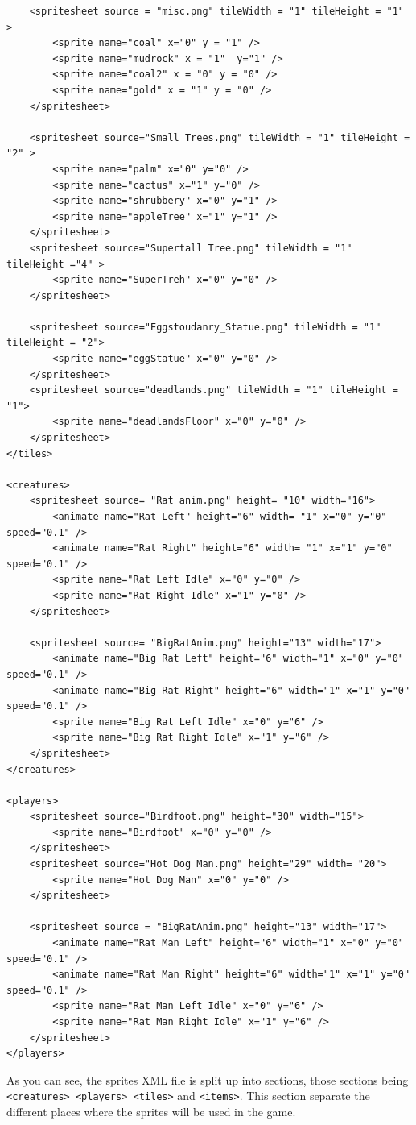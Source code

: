 \documentclass{book}
\begin{document}
\begin{verbatim}
	<spritesheet source = "misc.png" tileWidth = "1" tileHeight = "1" >
		<sprite name="coal" x="0" y = "1" />
		<sprite name="mudrock" x = "1"  y="1" />
		<sprite name="coal2" x = "0" y = "0" />
		<sprite name="gold" x = "1" y = "0" />
	</spritesheet>

	<spritesheet source="Small Trees.png" tileWidth = "1" tileHeight = "2" >
		<sprite name="palm" x="0" y="0" />
		<sprite name="cactus" x="1" y="0" />
		<sprite name="shrubbery" x="0" y="1" />
		<sprite name="appleTree" x="1" y="1" />
	</spritesheet>
	<spritesheet source="Supertall Tree.png" tileWidth = "1" tileHeight ="4" >
		<sprite name="SuperTreh" x="0" y="0" />
	</spritesheet>

	<spritesheet source="Eggstoudanry_Statue.png" tileWidth = "1" tileHeight = "2">
		<sprite name="eggStatue" x="0" y="0" />
	</spritesheet>
	<spritesheet source="deadlands.png" tileWidth = "1" tileHeight = "1">
		<sprite name="deadlandsFloor" x="0" y="0" />
	</spritesheet>
</tiles>

<creatures>
	<spritesheet source= "Rat anim.png" height= "10" width="16">
		<animate name="Rat Left" height="6" width= "1" x="0" y="0" speed="0.1" />
		<animate name="Rat Right" height="6" width= "1" x="1" y="0" speed="0.1" />
		<sprite name="Rat Left Idle" x="0" y="0" />
		<sprite name="Rat Right Idle" x="1" y="0" />
	</spritesheet>

	<spritesheet source= "BigRatAnim.png" height="13" width="17">
		<animate name="Big Rat Left" height="6" width="1" x="0" y="0" speed="0.1" />
		<animate name="Big Rat Right" height="6" width="1" x="1" y="0" speed="0.1" />
		<sprite name="Big Rat Left Idle" x="0" y="6" />
		<sprite name="Big Rat Right Idle" x="1" y="6" />
	</spritesheet>
</creatures>

<players>
	<spritesheet source="Birdfoot.png" height="30" width="15">
		<sprite name="Birdfoot" x="0" y="0" />
	</spritesheet>
	<spritesheet source="Hot Dog Man.png" height="29" width= "20">
		<sprite name="Hot Dog Man" x="0" y="0" />
	</spritesheet>

	<spritesheet source = "BigRatAnim.png" height="13" width="17">
		<animate name="Rat Man Left" height="6" width="1" x="0" y="0" speed="0.1" />
		<animate name="Rat Man Right" height="6" width="1" x="1" y="0" speed="0.1" />
		<sprite name="Rat Man Left Idle" x="0" y="6" />
		<sprite name="Rat Man Right Idle" x="1" y="6" />
	</spritesheet>
</players>
\end{verbatim}
	As you can see, the sprites XML file is split up into sections, those sections being \texttt{<creatures> <players> <tiles>} and \texttt{<items>}. This section separate the different places where the sprites will be used in the game.
\end{document}
